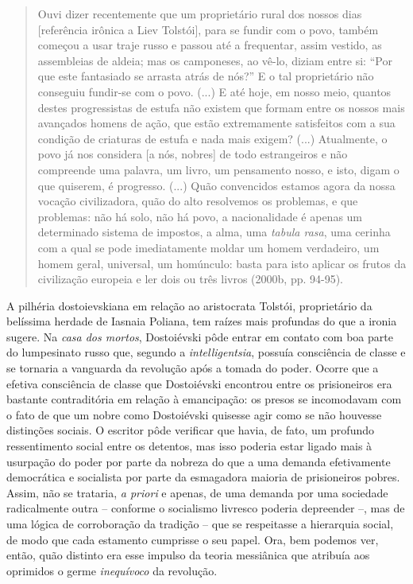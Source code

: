 \begin{quote}
Ouvi dizer recentemente que um proprietário rural dos nossos dias
{[}referência irônica a Liev Tolstói{]}, para se fundir com o povo,
também começou a usar traje russo e passou até a frequentar, assim
vestido, as assembleias de aldeia; mas os camponeses, ao vê-lo, diziam
entre si: ``Por que este fantasiado se arrasta atrás de nós?'' E o tal
proprietário não conseguiu fundir-se com o povo. (...) E até hoje, em
nosso meio, quantos destes progressistas de estufa não existem que
formam entre os nossos mais avançados homens de ação, que estão
extremamente satisfeitos com a sua condição de criaturas de estufa e
nada mais exigem? (...) Atualmente, o povo já nos considera {[}a nós,
nobres{]} de todo estrangeiros e não compreende uma palavra, um livro,
um pensamento nosso, e isto, digam o que quiserem, é progresso. (...)
Quão convencidos estamos agora da nossa vocação civilizadora, quão do
alto resolvemos os problemas, e que problemas: não há solo, não há povo,
a nacionalidade é apenas um determinado sistema de impostos, a alma, uma
\emph{tabula rasa}, uma cerinha com a qual se pode imediatamente moldar
um homem verdadeiro, um homem geral, universal, um homúnculo: basta para
isto aplicar os frutos da civilização europeia e ler dois ou três livros
(2000b, pp. 94-95).
\end{quote}

A pilhéria dostoievskiana em relação ao aristocrata Tolstói,
proprietário da belíssima herdade de Iasnaia Poliana, tem raízes mais
profundas do que a ironia sugere. Na \emph{casa dos mortos}, Dostoiévski
pôde entrar em contato com boa parte do lumpesinato russo que, segundo a
\emph{intelligentsia}, possuía consciência de classe e se tornaria a
vanguarda da revolução após a tomada do poder. Ocorre que a efetiva
consciência de classe que Dostoiévski encontrou entre os prisioneiros
era bastante contraditória em relação à emancipação: os presos se
incomodavam com o fato de que um nobre como Dostoiévski quisesse agir
como se não houvesse distinções sociais. O escritor pôde verificar que
havia, de fato, um profundo ressentimento social entre os detentos, mas
isso poderia estar ligado mais à usurpação do poder por parte da nobreza
do que a uma demanda efetivamente democrática e socialista por parte da
esmagadora maioria de prisioneiros pobres. Assim, não se trataria,
\emph{a priori} e apenas, de uma demanda por uma sociedade radicalmente
outra -- conforme o socialismo livresco poderia depreender --, mas de
uma lógica de corroboração da tradição -- que se respeitasse a
hierarquia social, de modo que cada estamento cumprisse o seu papel.
Ora, bem podemos ver, então, quão distinto era esse impulso da teoria
messiânica que atribuía aos oprimidos o germe \emph{inequívoco} da
revolução.


